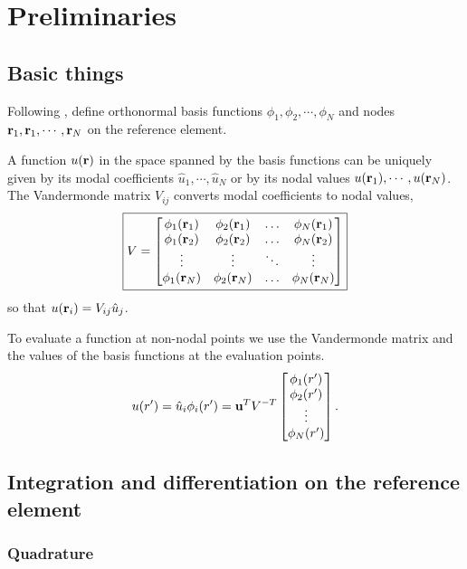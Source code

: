 \chapter{Preliminaries}
\label{chap:preliminaries}

\section{Basic things}

Following \cite{hesthaven2007nodal}, define orthonormal basis functions $\phi_1, \phi_2, \cdots, \phi_N$ and nodes $\textbf{r}_1, \textbf{r}_1, \cdots, \textbf{r}_N$ on the reference element.

A function $u(\textbf{r})$ in the space spanned by the basis functions can be uniquely given by its modal coefficients $\hat{u}_1, \cdots, \hat{u}_N$ or by its nodal values $u(\textbf{r}_1), \cdots, u(\textbf{r}_N)$.  The Vandermonde matrix $V_{ij}$ converts modal coefficients to nodal values,
%
\begin{equation}
\boxed{
V = \begin{bmatrix} \phi_1(\textbf{r}_1) & \phi_2(\textbf{r}_1) & \hdots & \phi_N(\textbf{r}_1) \\
\phi_1(\textbf{r}_2) & \phi_2(\textbf{r}_2) & \hdots & \phi_N(\textbf{r}_2) \\
\vdots & \vdots & \ddots & \vdots \\
\phi_1(\textbf{r}_N) & \phi_2(\textbf{r}_N) & \hdots & \phi_N(\textbf{r}_N)
\end{bmatrix}
}
\end{equation}
%
so that $u(\textbf{r}_i) = V_{ij} \hat{u}_j$.

To evaluate a function at non-nodal points we use the Vandermonde matrix and the values of the basis functions at the evaluation points.
%
\begin{equation}
u(r') = \hat{u}_i \phi_i(r') = \textbf{u}^T V^{-T} \begin{bmatrix} \phi_1(r') \\ \phi_2(r') \\ \vdots \\ \phi_N(r') \end{bmatrix}.
\label{eqn:interpolation}
\end{equation}

\section{Integration and differentiation on the reference element}

\subsection{Quadrature}

